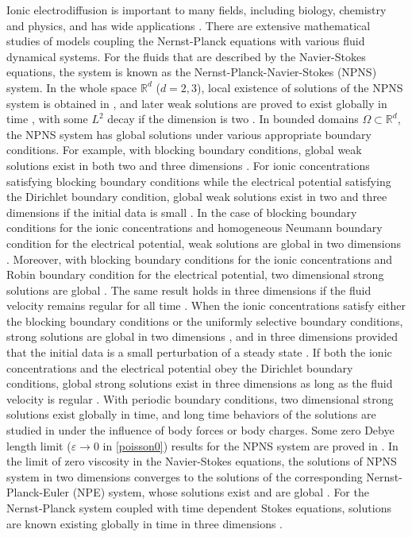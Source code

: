 \documentclass[10pt,twoside,reqno]{amsart}
\numberwithin{figure}{section}
\numberwithin{equation}{section}
\theoremstyle{definition}
\newcommand{\1}{\mathbbm{1}}
\newcommand{\R}{\mathbb{R}}
\newcommand{\ve}{\varepsilon}
\begin{document}
Ionic electrodiffusion is important to many fields, including biology, chemistry and physics, and has wide applications \cite{Rub90}. There are extensive mathematical studies of models coupling the Nernst-Planck equations with various fluid dynamical systems. For the fluids that are described by the Navier-Stokes equations, the system is known as the Nernst-Planck-Navier-Stokes (NPNS) system. In the whole space $\R^d$ ($d = 2, 3$), local existence of solutions of the NPNS system is obtained in \cite{Jer02}, and later weak solutions are proved to exist globally in time \cite{LW20}, with some $L^2$ decay if the dimension is two \cite{ZY15b}. In bounded domains $\Omega \subset \R^d$, the NPNS system has global solutions under various appropriate boundary conditions. For example, with blocking boundary conditions, global weak solutions exist in both two and three dimensions \cite{FS17, JS09}. For ionic concentrations satisfying blocking boundary conditions while the electrical potential satisfying the Dirichlet boundary condition, global weak solutions exist in two and three dimensions if the initial data is small \cite{Ryh09p}. In the case of blocking boundary conditions for the ionic concentrations and homogeneous Neumann boundary condition for the electrical potential, weak solutions are global in two dimensions \cite{Sch09}. Moreover, with blocking boundary conditions for the ionic concentrations and Robin boundary condition for the electrical potential, two dimensional strong solutions are global \cite{BFS14}. The same result holds in three dimensions if the fluid velocity remains regular for all time \cite{Lee21p}. When the ionic concentrations satisfy either the blocking boundary conditions or the uniformly selective boundary conditions, strong solutions are global in two dimensions \cite{CI19}, and in three dimensions provided that the initial data is a small perturbation of a steady state \cite{CIL20pa}. If both the ionic concentrations and the electrical potential obey the Dirichlet boundary conditions, global strong solutions exist in three dimensions as long as the fluid velocity is regular \cite{CIL20pb}. With periodic boundary conditions, two dimensional strong solutions exist globally in time, and long time behaviors of the solutions are studied in \cite{AI20p} under the influence of body forces or body charges. Some zero Debye length limit ($\ve \to 0$ in \eqref{poisson0}) results for the NPNS system are proved in \cite{CIL20pc, Li09, WJ21, WJL19}. In the limit of zero viscosity in the Navier-Stokes equations, the solutions of NPNS system in two dimensions converges to the solutions of the corresponding Nernst-Planck-Euler (NPE) system, whose solutions exist and are global \cite{IS21p, ZY15, ZY20}. For the Nernst-Planck system coupled with time dependent Stokes equations, solutions are known existing globally in time in three dimensions \cite{CIL20pb, Lee21p}.
\end{document}
